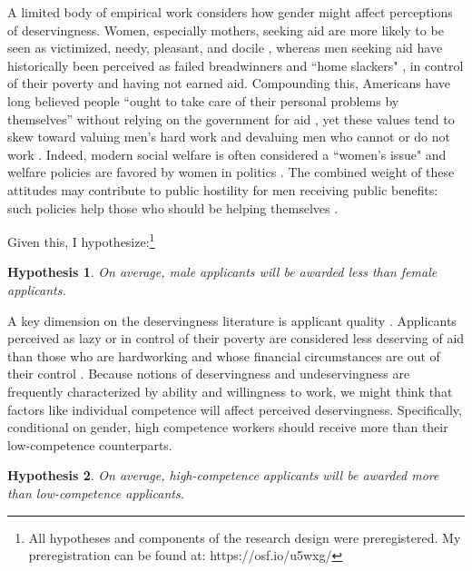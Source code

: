 \documentclass[12pt]{article}%
\newtheorem{hypothesis}{Hypothesis}
\begin{document}
\begin{doublespace}
A limited body of empirical work considers how gender might affect perceptions of deservingness. Women, especially mothers, seeking aid are more likely to be seen as victimized, needy, pleasant, and docile \citep{glick_hostile_1997, glick_ambivalent_2001, schneider_social_1993, monnat2010color, monnat2010toward, cassese2019intersectional}, whereas men seeking aid have historically been perceived as failed breadwinners and ``home slackers" \citep{willrich2000home}, in control of their poverty and having not earned aid. Compounding this, Americans have long believed people ``ought to take care of their personal problems by themselves” without relying on the government for aid \citep{sniderman_coping_1977}, yet these values tend to skew toward valuing men's hard work and devaluing men who cannot or do not work \citep{willrich2000home}. Indeed, modern social welfare is often considered a ``women's issue" and welfare policies are favored by women in politics \citep{krook2012all, greene2016diverse}. The combined weight of these attitudes may contribute to public hostility for men receiving public benefits: such policies help those who should be helping themselves \citep{bobocel_justice-based_1998, katz_racial_1988, sniderman_symbolic_1986, sniderman_beyond_1996, mclosky_ethos}.

Given this, I hypothesize:\footnote{All hypotheses and components of the research design were preregistered. My preregistration can be found at: https://osf.io/u5wxg/}

\begin{hypothesis} \label{hyp:first}
	On average, male applicants will be awarded less than female applicants.
\end{hypothesis}

A key dimension on the deservingness literature is applicant quality \citep{petersen2012deserves, petersen2012social}. Applicants perceived as lazy or in control of their poverty are considered less deserving of aid than those who are hardworking and whose financial circumstances are out of their control \citep{aaroe2014crowding}. Because notions of deservingness and undeservingness are frequently characterized by ability and willingness to work, we might think that factors like individual competence will affect perceived deservingness. Specifically, conditional on gender, high competence workers should receive more than their low-competence counterparts.

\begin{hypothesis} \label{hyp:second}
	On average, high-competence applicants will be awarded more than low-competence applicants.
\end{hypothesis}


\end{doublespace}
\end{document}
